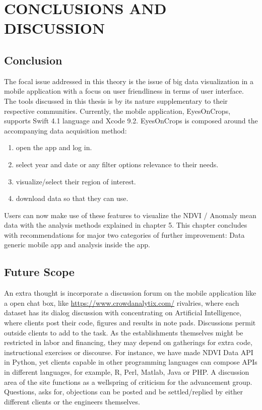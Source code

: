\chapter{CONCLUSIONS AND DISCUSSION}
\label{chap:conclusion}

\section{Conclusion}

The focal issue addressed in this theory is the issue of big data visualization in a mobile application with a focus on user friendliness in terms of user interface. The tools discussed in this thesis is by its nature supplementary to their respective communities. Currently, the mobile application, EyesOnCrops, supports Swift 4.1 language and Xcode 9.2. EyesOnCrops is composed around the accompanying data acquisition method:
\begin{enumerate}
  \item open the app and log in. 
  \item select year and date or any filter options relevance to their needs.
  \item visualize/select their region of interest.
  \item download data so that they can use.
\end{enumerate}

Users can now make use of these features to visualize the NDVI / Anomaly mean data with the analysis methods explained in chapter 5. 
This chapter concludes with recommendations for major two
categories of further improvement: Data generic mobile app and analysis inside the app.

\section{Future Scope}

An extra thought is incorporate a discussion forum on the mobile application like a open chat box, like \url{https://www.crowdanalytix.com/} rivalries, where each dataset has its dialog discussion with concentrating on Artificial Intelligence, where clients post their code, figures and results in note pads. Discussions permit outside clients to add to the task. As the establishments themselves might be restricted in labor and financing, they may depend on gatherings for extra code, instructional exercises or discourse. For instance, we have made NDVI Data API in Python, yet clients capable in other programming languages can compose APIs in different languages, for example, R, Perl, Matlab, Java or PHP. A discussion area of the site functions as a wellspring of criticism for the advancement group. Questions, asks for, objections can be posted and be settled/replied by either different clients or the engineers themselves. \\


